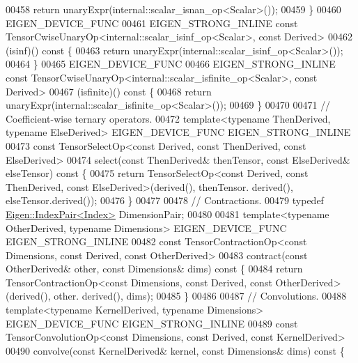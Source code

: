\begin{DoxyCode}
00458       \textcolor{keywordflow}{return} unaryExpr(internal::scalar\_isnan\_op<Scalar>());
00459     \}
00460     EIGEN\_DEVICE\_FUNC
00461     EIGEN\_STRONG\_INLINE \textcolor{keyword}{const} TensorCwiseUnaryOp<internal::scalar\_isinf\_op<Scalar>, \textcolor{keyword}{const} Derived>
00462     (isinf)()\textcolor{keyword}{ const }\{
00463       \textcolor{keywordflow}{return} unaryExpr(internal::scalar\_isinf\_op<Scalar>());
00464     \}
00465     EIGEN\_DEVICE\_FUNC
00466     EIGEN\_STRONG\_INLINE \textcolor{keyword}{const} TensorCwiseUnaryOp<internal::scalar\_isfinite\_op<Scalar>, \textcolor{keyword}{const} Derived>
00467     (isfinite)()\textcolor{keyword}{ const }\{
00468       \textcolor{keywordflow}{return} unaryExpr(internal::scalar\_isfinite\_op<Scalar>());
00469     \}
00470 
00471     \textcolor{comment}{// Coefficient-wise ternary operators.}
00472     \textcolor{keyword}{template}<\textcolor{keyword}{typename} ThenDerived, \textcolor{keyword}{typename} ElseDerived> EIGEN\_DEVICE\_FUNC EIGEN\_STRONG\_INLINE
00473     \textcolor{keyword}{const} TensorSelectOp<const Derived, const ThenDerived, const ElseDerived>
00474     select(\textcolor{keyword}{const} ThenDerived& thenTensor, \textcolor{keyword}{const} ElseDerived& elseTensor)\textcolor{keyword}{ const }\{
00475       \textcolor{keywordflow}{return} TensorSelectOp<const Derived, const ThenDerived, const ElseDerived>(derived(), thenTensor.
      derived(), elseTensor.derived());
00476     \}
00477 
00478     \textcolor{comment}{// Contractions.}
00479     \textcolor{keyword}{typedef} \hyperlink{struct_eigen_1_1_index_pair}{Eigen::IndexPair<Index>} DimensionPair;
00480 
00481     \textcolor{keyword}{template}<\textcolor{keyword}{typename} OtherDerived, \textcolor{keyword}{typename} Dimensions> EIGEN\_DEVICE\_FUNC EIGEN\_STRONG\_INLINE
00482     \textcolor{keyword}{const} TensorContractionOp<const Dimensions, const Derived, const OtherDerived>
00483     contract(\textcolor{keyword}{const} OtherDerived& other, \textcolor{keyword}{const} Dimensions& dims)\textcolor{keyword}{ const }\{
00484       \textcolor{keywordflow}{return} TensorContractionOp<const Dimensions, const Derived, const OtherDerived>(derived(), other.
      derived(), dims);
00485     \}
00486 
00487     \textcolor{comment}{// Convolutions.}
00488     \textcolor{keyword}{template}<\textcolor{keyword}{typename} KernelDerived, \textcolor{keyword}{typename} Dimensions> EIGEN\_DEVICE\_FUNC EIGEN\_STRONG\_INLINE
00489     \textcolor{keyword}{const} TensorConvolutionOp<const Dimensions, const Derived, const KernelDerived>
00490     convolve(\textcolor{keyword}{const} KernelDerived& kernel, \textcolor{keyword}{const} Dimensions& dims)\textcolor{keyword}{ const }\{

\end{DoxyCode}

